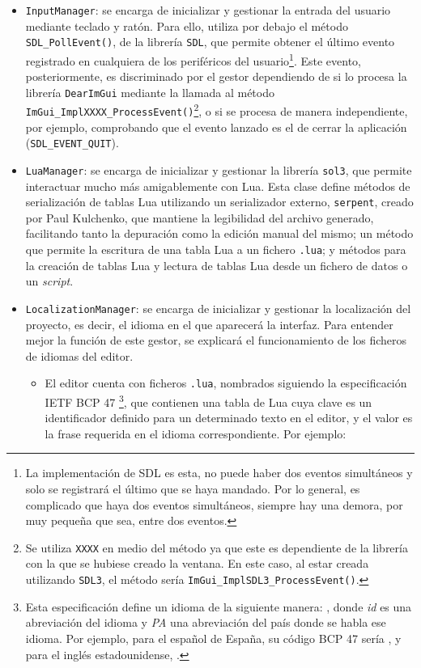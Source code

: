 \begin{itemize}
	\item \texttt{InputManager}: se encarga de inicializar y gestionar la entrada del usuario mediante teclado y ratón. Para ello, utiliza por debajo el método \texttt{SDL\_PollEvent()}, de la librería \texttt{SDL}, que permite obtener el último evento registrado en cualquiera de los periféricos del usuario\footnote{La implementación de SDL es esta, no puede haber dos eventos simultáneos y solo se registrará el último que se haya mandado. Por lo general, es complicado que haya dos eventos simultáneos, siempre hay una demora, por muy pequeña que sea, entre dos eventos.}. Este evento, posteriormente, es discriminado por el gestor dependiendo de si lo procesa la librería \texttt{DearImGui} mediante la llamada al método \texttt{ImGui\_ImplXXXX\_ProcessEvent()}\footnote{Se utiliza \texttt{XXXX} en medio del método ya que este es dependiente de la librería con la que se hubiese creado la ventana. En este caso, al estar creada utilizando \texttt{SDL3}, el método sería \texttt{ImGui\_ImplSDL3\_ProcessEvent()}.}, o si se procesa de manera independiente, por ejemplo, comprobando que el evento lanzado es el de cerrar la aplicación (\texttt{SDL\_EVENT\_QUIT}).
	\item \texttt{LuaManager}: se encarga de inicializar y gestionar la librería \texttt{sol3}, que permite interactuar mucho más amigablemente con Lua. Esta clase define métodos de serialización de tablas Lua utilizando un serializador externo, \texttt{serpent}, creado por Paul Kulchenko, que mantiene la legibilidad del archivo generado, facilitando tanto la depuración como la edición manual del mismo; un método que permite la escritura de una tabla Lua a un fichero \texttt{.lua}; y métodos para la creación de tablas Lua y lectura de tablas Lua desde un fichero de datos o un \textit{script}.
	\item \texttt{LocalizationManager}: se encarga de inicializar y gestionar la localización del proyecto, es decir, el idioma en el que aparecerá la interfaz. Para entender mejor la función de este gestor, se explicará el funcionamiento de los ficheros de idiomas del editor.
	\begin{itemize}
		\item El editor cuenta con ficheros \texttt{.lua}, nombrados siguiendo la especificación IETF BCP 47 \citep{rfc5646}\footnote{Esta especificación define un idioma de la siguiente manera: , donde \textit{id} es una abreviación del idioma y \textit{PA} una abreviación del país donde se habla ese idioma. Por ejemplo, para el español de España, su código BCP 47 sería , y para el inglés estadounidense, .}, que contienen una tabla de Lua cuya clave es un identificador definido para un determinado texto en el editor, y el valor es la frase requerida en el idioma correspondiente. Por ejemplo:

\end{itemize}
\end{itemize}
